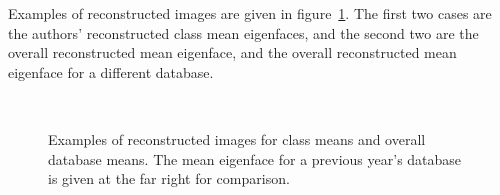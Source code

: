 Examples of reconstructed images are given in figure~\ref{fig:reconstructed-means}. The first two cases are the authors' reconstructed class mean eigenfaces, and the second two are the overall reconstructed mean eigenface, and the overall reconstructed mean eigenface for a different database.

\begin{figure}[htb]
 \centering
 \\
 \caption[Examples of reconstructed images]{Examples of reconstructed images for class means and overall database means. The mean eigenface for a previous year's database is given at the far right for comparison.}
 \label{fig:reconstructed-means}
\end{figure}

